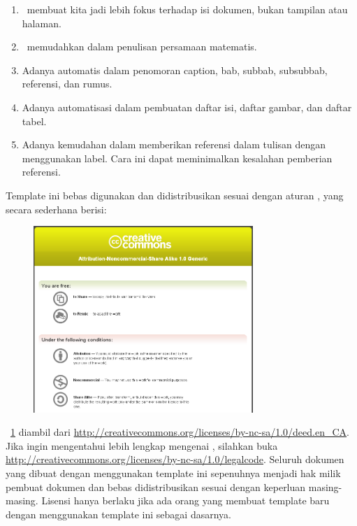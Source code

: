 \begin{enumerate}
	\item \latex~membuat kita jadi lebih fokus terhadap isi dokumen, bukan 
		tampilan atau halaman. 
	\item \latex~memudahkan dalam penulisan persamaan matematis. 
	\item Adanya automatis dalam penomoran caption, bab, subbab, subsubbab, 
		referensi, dan rumus. 
	\item Adanya automatisasi dalam pembuatan daftar isi, daftar gambar, dan
		daftar tabel. 
	\item Adanya kemudahan dalam memberikan referensi dalam tulisan dengan 
		menggunakan label. Cara ini dapat meminimalkan kesalahan pemberian 
		referensi. 
\end{enumerate}

Template ini bebas digunakan dan 
didistribusikan sesuai dengan aturan \license, yang secara sederhana berisi: 

\begin{figure}
	\centering
	\includegraphics[width=0.74\textwidth]
		{assets/pics/creative_common.png}
	\caption{\license}
	\label{fig:lisensi}
\end{figure}

\pic~\ref{fig:lisensi} diambil dari 
\url{http://creativecommons.org/licenses/by-nc-sa/1.0/deed.en_CA}. 
Jika ingin mengentahui lebih lengkap mengenai \license, silahkan buka 
\url{http://creativecommons.org/licenses/by-nc-sa/1.0/legalcode}. 
Seluruh dokumen yang dibuat dengan menggunakan template ini sepenuhnya 
menjadi hak milik pembuat dokumen dan bebas didistribusikan sesuai dengan 
keperluan masing-masing. 
Lisensi hanya berlaku jika ada orang yang membuat template baru dengan 
menggunakan template ini sebagai dasarnya. 

